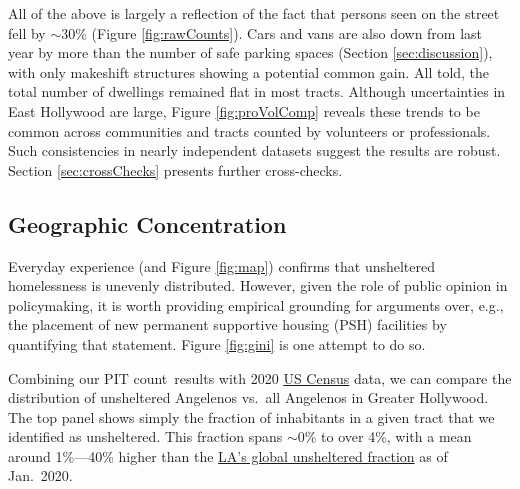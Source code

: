 \documentclass[11pt,twocolumn]{article}
\def\Count{count}
\begin{document}
All of the above is largely a reflection of the fact that persons seen on the street fell by $\sim$30\%
(Figure \ref{fig:rawCounts}). Cars and vans are also down from last year by more than the number of 
safe parking spaces (Section \ref{sec:discussion}), with only makeshift structures showing a potential 
common gain. All told, the total number of dwellings remained flat in most tracts. Although uncertainties 
in East Hollywood are large, Figure \ref{fig:proVolComp} reveals these trends to be common across 
communities and tracts counted by volunteers or professionals. Such consistencies in nearly independent 
datasets suggest the results are robust. Section \ref{sec:crossChecks} presents further cross-checks.


\subsection{Geographic Concentration}
\label{sec:concentration}

Everyday experience (and Figure \ref{fig:map}) confirms that unsheltered homelessness is
unevenly distributed. However, given the role of public opinion in policymaking, it is worth 
providing empirical grounding for arguments over, e.g., the placement of new permanent supportive 
housing (PSH) facilities by quantifying that statement. Figure \ref{fig:gini} is one attempt to do so. 

Combining our PIT \Count\ results with 2020 
\href{https://geomap.ffiec.gov/FFIECGeocMap/GeocodeMap1.aspx}{US Census} 
data, we can compare the distribution of unsheltered Angelenos vs.\ all Angelenos in Greater
Hollywood. The top panel shows simply the fraction of inhabitants in a given tract that we
identified as unsheltered. This fraction spans $\sim$0\% to over 4\%, with a mean around 
1\%---40\% higher than the \href{https://www.lahsa.org/documents?id=4680-2020-greater-los-angeles-homeless-count-city-of-los-angeles}{LA's global unsheltered fraction} as of Jan.~2020.
\end{document}

